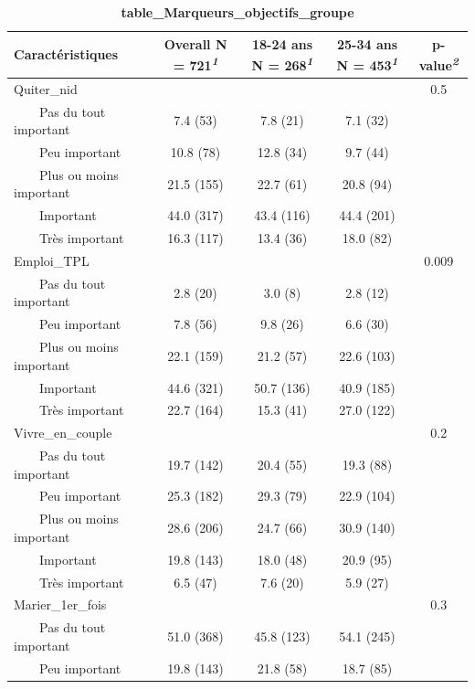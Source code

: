 \documentclass[
]{article}
\begin{document}
\begin{table}[!t]
\caption{\label{tab:unnamed-chunk-55}\textbf{table\_Marqueurs\_objectifs\_groupe}} 
\fontsize{12.0pt}{14.4pt}\selectfont
\begin{tabular*}{\linewidth}{@{\extracolsep{\fill}}lcccc}
\toprule
\textbf{Caractéristiques} & \textbf{Overall}  N = 721\textsuperscript{\textit{1}} & \textbf{18-24 ans}  N = 268\textsuperscript{\textit{1}} & \textbf{25-34 ans}  N = 453\textsuperscript{\textit{1}} & \textbf{p-value}\textsuperscript{\textit{2}} \\ 
\midrule\addlinespace[2.5pt]
Quiter\_nid &  &  &  & 0.5 \\ 
    Pas du tout important & 7.4 (53) & 7.8 (21) & 7.1 (32) &  \\ 
    Peu important & 10.8 (78) & 12.8 (34) & 9.7 (44) &  \\ 
    Plus ou moins important & 21.5 (155) & 22.7 (61) & 20.8 (94) &  \\ 
    Important & 44.0 (317) & 43.4 (116) & 44.4 (201) &  \\ 
    Très important & 16.3 (117) & 13.4 (36) & 18.0 (82) &  \\ 
Emploi\_TPL &  &  &  & 0.009 \\ 
    Pas du tout important & 2.8 (20) & 3.0 (8) & 2.8 (12) &  \\ 
    Peu important & 7.8 (56) & 9.8 (26) & 6.6 (30) &  \\ 
    Plus ou moins important & 22.1 (159) & 21.2 (57) & 22.6 (103) &  \\ 
    Important & 44.6 (321) & 50.7 (136) & 40.9 (185) &  \\ 
    Très important & 22.7 (164) & 15.3 (41) & 27.0 (122) &  \\ 
Vivre\_en\_couple &  &  &  & 0.2 \\ 
    Pas du tout important & 19.7 (142) & 20.4 (55) & 19.3 (88) &  \\ 
    Peu important & 25.3 (182) & 29.3 (79) & 22.9 (104) &  \\ 
    Plus ou moins important & 28.6 (206) & 24.7 (66) & 30.9 (140) &  \\ 
    Important & 19.8 (143) & 18.0 (48) & 20.9 (95) &  \\ 
    Très important & 6.5 (47) & 7.6 (20) & 5.9 (27) &  \\ 
Marier\_1er\_fois &  &  &  & 0.3 \\ 
    Pas du tout important & 51.0 (368) & 45.8 (123) & 54.1 (245) &  \\ 
    Peu important & 19.8 (143) & 21.8 (58) & 18.7 (85) &  \\ 

\end{tabular*}
\end{table}
\end{document}
